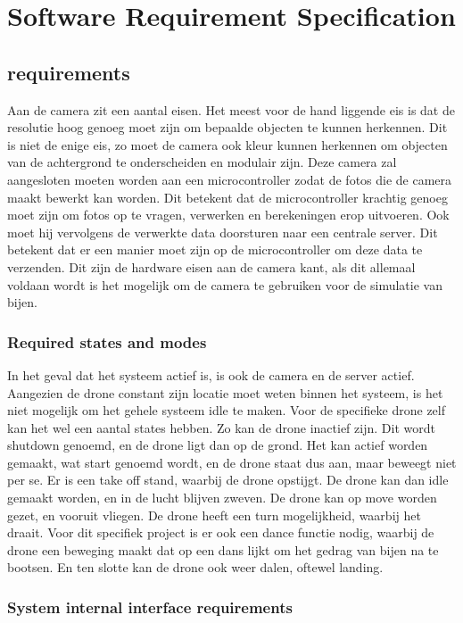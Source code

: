 \section{Software Requirement Specification}

\subsection{requirements}
Aan de camera zit een aantal eisen. Het meest voor de hand liggende eis is dat de resolutie hoog genoeg moet zijn
om bepaalde objecten te kunnen herkennen. Dit is niet de enige eis, zo moet de camera ook kleur kunnen herkennen om objecten van de achtergrond te onderscheiden en modulair zijn. Deze camera zal aangesloten moeten worden aan een microcontroller zodat de fotos die de camera maakt bewerkt kan worden. Dit betekent dat de microcontroller krachtig genoeg moet zijn om fotos op te vragen, verwerken en berekeningen erop uitvoeren. Ook moet hij vervolgens de verwerkte data doorsturen naar een centrale server. Dit betekent dat er een manier moet zijn op de microcontroller om deze data te verzenden.
Dit zijn de hardware eisen aan de camera kant, als dit allemaal voldaan wordt is het mogelijk om de camera te gebruiken voor de simulatie van bijen.

\subsubsection*{Required states and modes}
In het geval dat het systeem actief is, is ook de camera en de server actief. Aangezien de drone constant zijn locatie moet weten binnen het systeem, is het niet mogelijk om het gehele systeem idle te maken. Voor de specifieke drone zelf kan het wel een aantal states hebben. Zo kan de drone inactief zijn. Dit wordt shutdown genoemd, en de drone ligt dan op de grond. Het kan actief worden gemaakt, wat start genoemd wordt, en de drone staat dus aan, maar beweegt niet per se. Er is een take off stand, waarbij de drone opstijgt. De drone kan dan idle gemaakt worden, en in de lucht blijven zweven. De drone kan op move worden gezet, en vooruit vliegen. De drone heeft een turn mogelijkheid, waarbij het draait. Voor dit specifiek project is er ook een dance functie nodig, waarbij de drone een beweging maakt dat op een dans lijkt om het gedrag van bijen na te bootsen. En ten slotte kan de drone ook weer dalen, oftewel landing.

\subsubsection*{System internal interface requirements}


